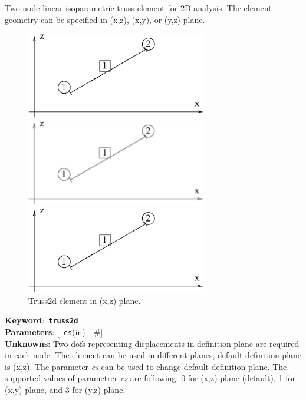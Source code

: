 \documentclass[a4paper]{article}
\newcommand{\descitem}[1]{{\noindent \bf #1}:}
\newcommand{\elemkeyword}[1]{\descitem{Keyword}~{\bf \texttt{#1}}}
\newcommand{\elemparam}[2]{{{\texttt{#1}\tiny (#2)}~~\#}}
\newcommand{\optelemparam}[2]{{[~\elemparam{#1}{#2}]}}
\newcommand{\param}[1]{{\em #1}}
\begin{document}
Two node linear isoparametric truss element for 2D analysis. The
element geometry can be specified in (x,z), (x,y), or (y,z) plane. 
\begin{figure}[tb]
\begin{htmlonly}
  \centerline{\includegraphics[width=0.7\textwidth]{truss2d.eps}}
\end{htmlonly}
\ifpdf
\centerline{\includegraphics[width=0.7\textwidth]{truss2d.pdf}}
\else
\centerline{\includegraphics[width=0.7\textwidth]{truss2d.eps}}
\fi
\caption{Truss2d element in (x,z) plane.}
\end{figure}

\elemkeyword{truss2d}\\
\descitem{Parameters} \optelemparam{cs}{in}\\

\descitem{Unknowns}
Two dofs representing displacements in definition plane are required
in each node. The element can be used in different planes, default
definition plane is (x,z). The parameter \param{cs} can be used to
change default definition plane. The supported values of parametrer
\param{cs} are following: 0 for (x,z) plane (default), 1 for (x,y)
plane, and 3 for (y,z) plane.
\end{document}
